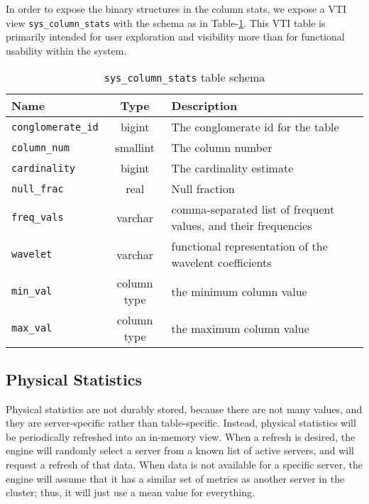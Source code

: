 In order to expose the binary structures in the column stats, we expose a VTI view \linebreak\texttt{sys\_column\_stats} with the schema as in Table-\ref{table:columnStats}. This VTI table is primarily intended for user exploration and visibility more than for functional usability within the system.

\begin{table}
				\begin{tabular}{|l|c|p{6cm}|}
								\hline
								\bf{Name}									& \bf{Type}	&	\bf{Description} \\ \hline	
								\texttt{conglomerate\_id}	&	bigint		&	The conglomerate id for the table \\ \hline
								\texttt{column\_num}			&	smallint	&	The column number \\ \hline
								\texttt{cardinality}			&	bigint		&	The cardinality estimate \\ \hline
								\texttt{null\_frac}				&	real			& Null fraction \\ \hline
								\texttt{freq\_vals}				&	varchar		&	comma-separated list of frequent values, and their frequencies \\ \hline	
								\texttt{wavelet}					&	varchar		&	functional representation of the wavelent coefficients \\ \hline
								\texttt{min\_val}					&	column type	&	the minimum column value \\ \hline
								\texttt{max\_val}					&	column type	& the maximum column value \\ \hline
				\end{tabular}
				\caption{\texttt{sys\_column\_stats} table schema}
				\label{table:columnStats}
\end{table}

\subsection{Physical Statistics}
Physical statistics are not durably stored, because there are not many values, and they are server-specific rather than table-specific. Instead, physical statistics will be periodically refreshed into an in-memory view. When a refresh is desired, the engine will randomly select a server from a known list of active servers, and will request a refresh of that data. When data is not available for a specific server, the engine will assume that it has a similar set of metrics as another server in the cluster; thus, it will just use a mean value for everything.

